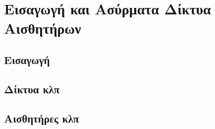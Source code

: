 


\chapter{Εισαγωγή και Ασύρματα Δίκτυα Αισθητήρων}
\section{Εισαγωγή}
\section{Δίκτυα κλπ}
\section{Αισθητήρες κλπ}
\label{ch:wsns}